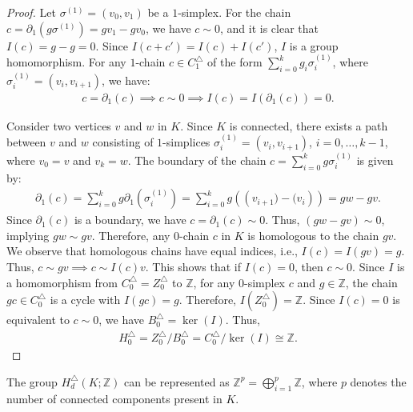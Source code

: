 \begin{proof}
	Let \( \sigma^{(1)} = (v_{0}, v_{1}) \) be a \( 1 \)-simplex. For the chain \( c = \partial_{1}(g \sigma^{(1)}) = g v_{1} - g v_{0} \), we have \( c \sim 0 \), and it is clear that \( I(c) = g - g = 0 \). Since \( I(c + c') = I(c) + I(c') \), \( I \) is a group homomorphism. For any \( 1 \)-chain \( c \in C^{\triangle}_{1} \) of the form \( \sum_{i=0}^{k} g_{i} \sigma_{i}^{(1)} \), where \( \sigma_{i}^{(1)} = (v_{i}, v_{i+1}) \), we have:
	\begin{align}
		c = \partial_{1}(c) \implies c \sim 0 \implies I(c) = I(\partial_{1}(c)) = 0. 
	\end{align}
				
	Consider two vertices \( v \) and \( w \) in \( K \). Since \( K \) is connected, there exists a path between \( v \) and \( w \) consisting of \( 1 \)-simplices \( \sigma_{i}^{(1)} = (v_{i}, v_{i+1}) \), \( i = 0, \ldots, k-1 \), where \( v_{0} = v \) and \( v_{k} = w \). The boundary of the chain \( c = \sum_{i=0}^{k} g \sigma_{i}^{(1)} \) is given by:
	\begin{align}
		\partial_{1}(c) = \sum_{i=0}^{k} g \partial_{1}(\sigma_{i}^{(1)}) = \sum_{i=0}^{k} g \left(\left(v_{i+1}) - (v_{i}\right)\right) = g w - g v. 
	\end{align}
	Since \( \partial_{1}(c) \) is a boundary, we have \( c = \partial_{1}(c) \sim 0 \). Thus, \( (g w - g v) \sim 0 \), implying \( g w \sim g v \). Therefore, any \( 0 \)-chain \( c \) in \( K \) is homologous to the chain \( g v \). We observe that homologous chains have equal indices, i.e., \( I(c) = I(g v) = g \). Thus, \( c \sim g v \implies c \sim I(c) v \). This shows that if \( I(c) = 0 \), then \( c \sim 0 \). Since \( I \) is a homomorphism from \( C^{\triangle}_{0} = Z^{\triangle}_{0} \) to \( \mathbb{Z} \), for any \( 0 \)-simplex \( c \) and \( g \in \mathbb{Z} \), the chain \( g c \in C^{\triangle}_{0} \) is a cycle with \( I(g c) = g \). Therefore, \( I(Z^{\triangle}_{0}) = \mathbb{Z} \). Since \( I(c) = 0 \) is equivalent to \( c \sim 0 \), we have \( B^{\triangle}_{0} = \ker(I) \). Thus,
	\begin{align}
		H^{\triangle}_{0} = Z^{\triangle}_{0} / B^{\triangle}_{0} = C_0^\triangle / \ker(I) \cong \mathbb{Z}. 
	\end{align}
\end{proof}

\begin{corollary}
	\label{directsum0hom}
	The group $H_d^\triangle(K;\mathbb{Z})$ can be represented as \( \mathbb{Z}^{p} = \bigoplus_{i=1}^{p} \mathbb{Z} \), where \( p \) denotes the number of connected components present in \( K \).
\end{corollary}

